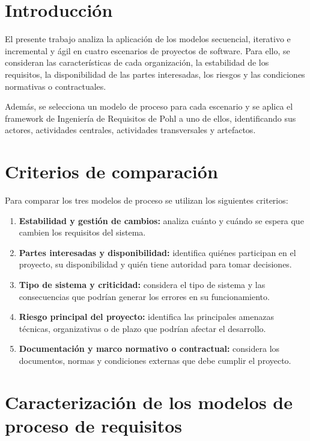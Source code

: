 \documentclass[12pt,a4paper]{article}
\begin{document}
\section{Introducción}

El presente trabajo analiza la aplicación de los modelos
secuencial, iterativo e incremental y ágil en cuatro
escenarios de proyectos de software. Para ello, se
consideran las características de cada organización,
la estabilidad de los requisitos, la disponibilidad de
las partes interesadas, los riesgos y las condiciones
normativas o contractuales.

Además, se selecciona un modelo de proceso para cada
escenario y se aplica el framework de Ingeniería de
Requisitos de Pohl a uno de ellos, identificando sus
actores, actividades centrales, actividades
transversales y artefactos.

\section{Criterios de comparación}

Para comparar los tres modelos de proceso se utilizan
los siguientes criterios:

\begin{enumerate}[label=\textbf{K\arabic*.}]
    \item \textbf{Estabilidad y gestión de cambios:}
    analiza cuánto y cuándo se espera que cambien los
    requisitos del sistema.

    \item \textbf{Partes interesadas y disponibilidad:}
    identifica quiénes participan en el proyecto, su
    disponibilidad y quién tiene autoridad para tomar
    decisiones.

    \item \textbf{Tipo de sistema y criticidad:}
    considera el tipo de sistema y las consecuencias
    que podrían generar los errores en su funcionamiento.

    \item \textbf{Riesgo principal del proyecto:}
    identifica las principales amenazas técnicas,
    organizativas o de plazo que podrían afectar el
    desarrollo.

    \item \textbf{Documentación y marco normativo o
    contractual:}
    considera los documentos, normas y condiciones
    externas que debe cumplir el proyecto.
\end{enumerate}

\section{Caracterización de los modelos de proceso de requisitos}
\end{document}
